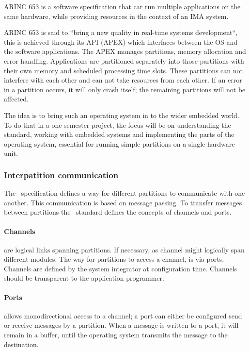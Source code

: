ARINC 653 is a software specification that car run multiple applications on the same hardware, while providing resources in the context of an IMA system.

ARINC 653 is said to “bring a new quality in real-time systems development“,
this is achieved through its API (APEX) which interfaces between the OS and the software applications.
The APEX manages partitions, memory allocation and error handling.
Applications are partitioned separately into those partitions with their own memory and scheduled processing time slots.
These partitions can not interfere with each other and can not take resources from each other.
If an error in a partition occurs, it will only crash itself; the remaining partitions will not be affected.

The idea is to bring such an operating system in to the wider embedded world.
To do that in a one semester project, the focus will be on understanding the standard,
working with embedded systems and implementing the parts of the operating system,
essential for running simple partitions on a single hardware unit.

\subsubsection{Interpatition communication}
The \arinc\ specification defines a way for different partitions to communicate with one another.
This communication is based on message passing. To transfer messages between partitions the \arinc\ standard
defines the concepts of channels and ports.

\paragraph{Channels} are logical links spanning partitions. If necessary, as channel might logically span different modules. 
The way for partitions to access a channel, is via ports.
Channels are defined by the system integrator at configuration time.
Channels should be transparent to the application programmer.

\paragraph{Ports} allows monodirectional access to a channel;
a port can either be configured send or receive messages by a partition.
When a message is written to a port, it will remain in a buffer, until the operating system transmits the message to the destination.\\

